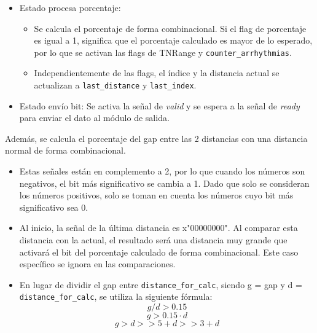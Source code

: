 \begin{itemize}
    \item Estado procesa porcentaje: 
    \begin{itemize}
        \item Se calcula el porcentaje de forma combinacional. Si el flag de porcentaje es igual a 1, significa que el porcentaje calculado es mayor de lo esperado, por lo que se activan las flags de TNRange y \texttt{counter\_arrhythmias}.
        \item Independientemente de las flags, el índice y la distancia actual se actualizan a \texttt{last\_distance} y \texttt{last\_index}.
    \end{itemize}
    \item Estado envío bit: Se activa la señal de \textit{valid} y se espera a la señal de \textit{ready} para enviar el dato al módulo de salida.
\end{itemize}

Además, se calcula el porcentaje del gap entre las 2 distancias con una distancia normal de forma combinacional.

\begin{itemize}
    \item Estas señales están en complemento a 2, por lo que cuando los números son negativos, el bit más significativo se cambia a 1. Dado que solo se consideran los números positivos, solo se toman en cuenta los números cuyo bit más significativo sea 0.
    \item Al inicio, la señal de la última distancia es x"00000000". Al comparar esta distancia con la actual, el resultado será una distancia muy grande que activará el bit del porcentaje calculado de forma combinacional. Este caso específico se ignora en las comparaciones.
    \item En lugar de dividir el gap entre \texttt{distance\_for\_calc},  siendo g = gap y d = \texttt{distance\_for\_calc}, se utiliza la siguiente fórmula:
    \[ g/d > 0.15\] 
    \[g > 0.15 \cdot d \] 
    \[g > d>> 5 + d>> 3 + d\] 
\end{itemize}

